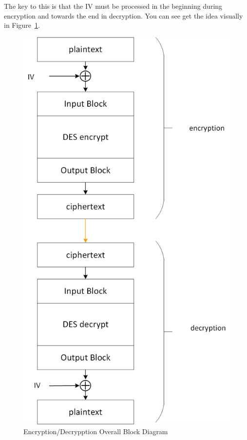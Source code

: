 \documentclass{article}
\begin{document}
The key to this is that the IV must be processed in the beginning
during encryption and towards the end in decryption.  You can see get
the idea visually in Figure~\ref{overview-block.png}.
\begin{figure} [t!]
  \centering
  \includegraphics[scale=0.5]{overall-block.png}
  \caption{Encryption/Decrypption Overall Block Diagram}
  \label{overview-block.png}
\end{figure}
\end{document}
